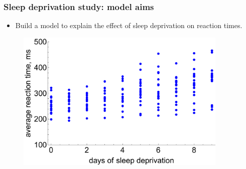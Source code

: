 \documentclass[handout]{beamer}
\begin{document}
\begin{frame}
	\frametitle{Sleep deprivation study: model aims}
	
	\begin{itemize}
		\item<2-> Build a model to explain the effect of sleep deprivation on reaction times.
	\end{itemize}
	
	\begin{figure}[ht]
		\centerline{\includegraphics[width=0.9\textwidth]{./Figures/lec4_sleepData.pdf}}
	\end{figure}
	
\end{frame}
\end{document}
